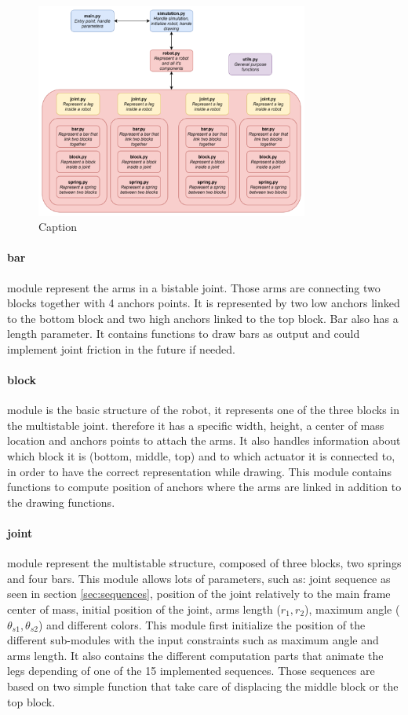         \begin{figure}
            \centering
            \includegraphics[width=0.8\textwidth]{images/code_structure.png}
            \caption{Caption}
            \label{fig:code_structure}
        \end{figure}
        
        \paragraph{bar}
            module represent the arms in a bistable joint. Those arms are connecting two blocks together with 4 anchors points. It is represented by two low anchors linked to the bottom block and two high anchors linked to the top block. Bar also has a length parameter. It contains functions to draw bars as output and could implement joint friction in the future if needed. 
        \paragraph{block}
            module is the basic structure of the robot, it represents one of the three blocks in the multistable joint. therefore it has a specific width, height, a center of mass location and anchors points to attach the arms. It also handles information about which block it is (bottom, middle, top) and to which actuator it is connected to, in order to have the correct representation while drawing. This module contains functions to compute position of anchors where the arms are linked in addition to the drawing functions.
        \paragraph{joint}
            module represent the multistable structure, composed of three blocks, two springs and four bars. This module allows lots of parameters, such as: joint sequence as seen in section \ref{sec:sequences}, position of the joint relatively to the main frame center of mass, initial position of the joint, arms length ($r_1, r_2$), maximum angle ($\theta_{s1}, \theta_{s2}$) and different colors. This module first initialize the position of the different sub-modules with the input constraints such as maximum angle and arms length. It also contains the different computation parts that animate the legs depending of one of the 15 implemented sequences. Those sequences are based on two simple function that take care of displacing the middle block or the top block. 
